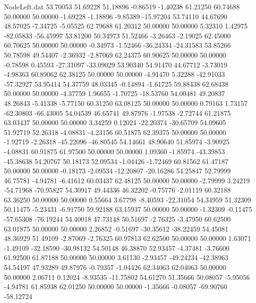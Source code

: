 \begin{filecontents}{NodeLeft.dat}
  53.70053   51.69228   51.18896    -0.86519   -1.40238   61.21250   60.74688   50.00000   50.00000   -1.69228   -1.18896   -9.85389  -15.97204
  53.74110   44.67690   48.57025    -7.34725   -5.05525   62.79688   61.20312   50.00000   50.00000    5.32310    1.42975  -82.05833  -56.45997
  53.81200   50.34973   51.52466    -3.26463   -2.19025   62.45000   60.70625   50.00000   50.00000   -0.34973   -1.52466  -36.24334  -24.31583
  53.85266   50.78598   49.54407    -2.36932   -2.87069   62.24375   60.90625   50.00000   50.00000   -0.78598    0.45593  -27.31097  -33.09029
  53.90340   54.91470   44.67712    -3.73019   -4.98363   60.89062   62.38125   50.00000   50.00000   -4.91470    5.32288  -42.91033  -57.32927
  53.95414   54.37759   48.03345    -0.14894   -1.61725   59.88438   62.68438   50.00000   50.00000   -4.37759    1.96655   -1.70725  -18.53760
  54.00481   49.20837   48.26843    -5.41338   -5.77150   60.31250   63.08125   50.00000   50.00000    0.79163    1.73157  -62.30803  -66.43005
  54.04539   46.65741   49.87976    -1.97538   -2.72744   61.21875   63.03437   50.00000   50.00000    3.34259    0.12024  -22.20374  -30.65709
  54.09605   51.92719   52.26318    -4.08831   -4.23156   60.51875   62.39375   50.00000   50.00000   -1.92719   -2.26318  -45.22096  -46.80545
  54.14661   48.90640   51.85974    -3.90925   -4.08831   60.91875   61.97500   50.00000   50.00000    1.09360   -1.85974  -43.39853  -45.38638
  54.20767   50.18173   52.09534    -1.04426   -1.72469   60.81562   61.47187   50.00000   50.00000   -0.18173   -2.09534  -12.20807  -20.16286
  54.25847   52.79999   46.75781    -4.94781   -6.41612   60.03437   62.48125   50.00000   50.00000   -2.79999    3.24219  -54.71968  -70.95827
  54.30917   49.44336   46.32202    -0.75776   -2.01119   60.32188   63.36250   50.00000   50.00000    0.55664    3.67798   -8.40593  -22.31054
  54.34959   51.32309   50.11475    -5.23431   -6.91750   59.92188   63.15937   50.00000   50.00000   -1.32309   -0.11475  -57.65308  -76.19244
  54.40018   47.73148   50.51697    -2.76325   -3.47950   60.62500   63.01875   50.00000   50.00000    2.26852   -0.51697  -30.35612  -38.22459
  54.45081   48.36929   51.49109    -2.87069   -2.76325   60.97813   62.62500   50.00000   50.00000    1.63071   -1.49109  -32.18590  -30.98132
  54.50148   46.38870   52.93457    -4.37481   -3.76600   61.92500   61.87188   50.00000   50.00000    3.61130   -2.93457  -49.24234  -42.38963
  54.54197   47.93289   49.87976    -0.79357   -1.04426   62.34063   62.04063   50.00000   50.00000    2.06711    0.12024   -8.93535  -11.75802
  54.61270   51.35666   50.08057    -5.95056   -4.94781   61.85938   62.01250   50.00000   50.00000   -1.35666   -0.08057  -69.90760  -58.12724

\end{filecontents}
